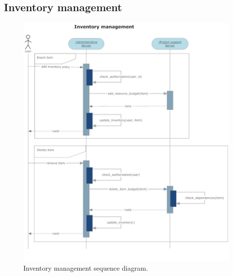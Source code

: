 \subsection{Inventory management}
\begin{figure}[H]
\begin{centering}
\includegraphics[scale=0.45]{assign3/sdraw/imgs/inventory.jpg}
\caption{Inventory management sequence diagram.}
\label{3img:[sequence]inventory}
\end{centering}
\end{figure}
